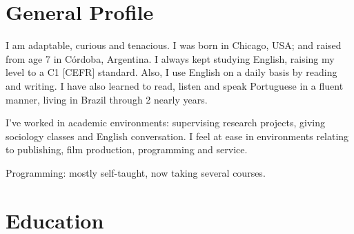 \section{General Profile}

I am adaptable, curious and tenacious. I was born in Chicago, USA; and raised from age 7 in Córdoba, Argentina. 
%
I always kept studying English, raising my level to a C1 [CEFR] standard. 
Also, I use English on a daily basis by reading and writing. 
I have also learned to read, listen and speak Portuguese in a fluent manner, living in Brazil through 2 nearly years. 


I've worked in academic environments: supervising research projects, giving sociology classes and English conversation. %
I feel at ease in environments relating to publishing, film production, programming and service.

Programming: mostly self-taught, now taking several courses.



\section{Education}

